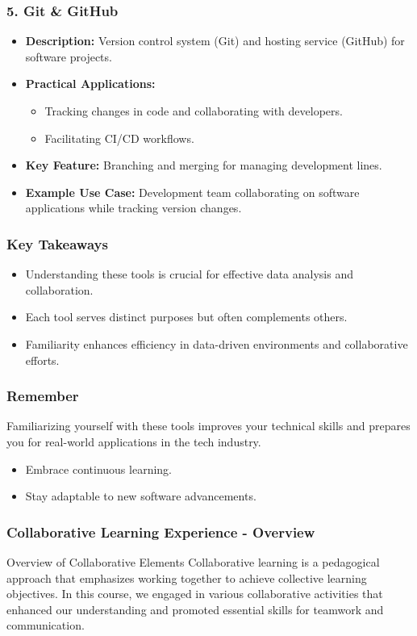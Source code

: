 \documentclass[aspectratio=169]{beamer}
\begin{document}
\begin{frame}[fragile]
    \frametitle{5. Git \& GitHub}
    \begin{itemize}
        \item \textbf{Description:} Version control system (Git) and hosting service (GitHub) for software projects.
        \item \textbf{Practical Applications:}
        \begin{itemize}
            \item Tracking changes in code and collaborating with developers.
            \item Facilitating CI/CD workflows.
        \end{itemize}
        \item \textbf{Key Feature:} Branching and merging for managing development lines.
        \item \textbf{Example Use Case:} Development team collaborating on software applications while tracking version changes.
    \end{itemize}
\end{frame}

\begin{frame}[fragile]
    \frametitle{Key Takeaways}
    \begin{itemize}
        \item Understanding these tools is crucial for effective data analysis and collaboration.
        \item Each tool serves distinct purposes but often complements others.
        \item Familiarity enhances efficiency in data-driven environments and collaborative efforts.
    \end{itemize}
\end{frame}

\begin{frame}[fragile]
    \frametitle{Remember}
    Familiarizing yourself with these tools improves your technical skills and prepares you for real-world applications in the tech industry. 
    \begin{itemize}
        \item Embrace continuous learning.
        \item Stay adaptable to new software advancements.
    \end{itemize}
\end{frame}

\begin{frame}[fragile]
    \frametitle{Collaborative Learning Experience - Overview}
    \begin{block}{Overview of Collaborative Elements}
        Collaborative learning is a pedagogical approach that emphasizes working together to achieve collective learning objectives. In this course, we engaged in various collaborative activities that enhanced our understanding and promoted essential skills for teamwork and communication.
    \end{block}
\end{frame}
\end{document}
